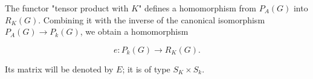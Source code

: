 The functor "tensor product with $K$" defines a homomorphism from $P_A(G)$ into $R_K(G)$. Combining it with the inverse of the canonical isomorphism $P_A(G) \to P_k(G)$, we obtain a homomorphism

$$e: P_k(G) \to R_K(G).$$

Its matrix will be denoted by $E$; it is of type $S_K \times S_k$.